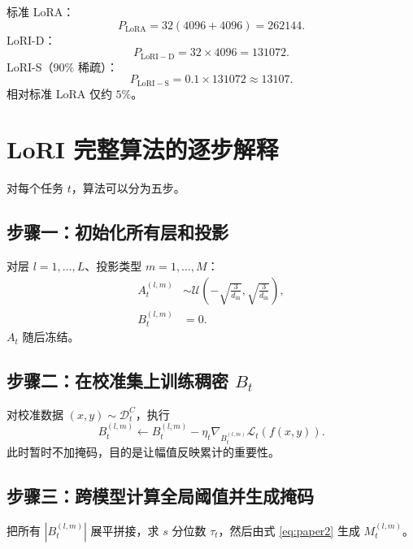 \documentclass[UTF8,12pt,a4paper,fontset=none]{ctexart}
\numberwithin{equation}{section}
\newcommand{\Loss}{\mathcal{L}}
\newcommand{\Dc}{\mathcal{D}^{C}_t}
\begin{document}
\begin{examplebox}[以 $d=4096,r=32$ 为例]
标准 LoRA：
\begin{equation*}
  P_{\mathrm{LoRA}}=32(4096+4096)=262144.
\end{equation*}
LoRI-D：
\begin{equation*}
  P_{\mathrm{LoRI-D}}=32\times4096=131072.
\end{equation*}
LoRI-S（$90\%$ 稀疏）：
\begin{equation*}
  P_{\mathrm{LoRI-S}}=0.1\times131072\approx13107.
\end{equation*}
相对标准 LoRA 仅约 $5\%$。
\end{examplebox}

\section{LoRI 完整算法的逐步解释}

对每个任务 $t$，算法可以分为五步。

\subsection{步骤一：初始化所有层和投影}

对层 $l=1,\ldots,L$、投影类型 $m=1,\ldots,M$：
\begin{align}
  A_t^{(l,m)}
  &\sim \mathcal{U}\left(
  -\sqrt{\frac{3}{d_{\mathrm{in}}}},
  \sqrt{\frac{3}{d_{\mathrm{in}}}}
  \right),\\
  B_t^{(l,m)}&=0.
\end{align}
$A_t$ 随后冻结。

\subsection{步骤二：在校准集上训练稠密 \texorpdfstring{$B_t$}{B t}}

对校准数据 $(x,y)\sim\Dc$，执行
\begin{equation}
  B_t^{(l,m)}\leftarrow B_t^{(l,m)}
  -\eta_t\nabla_{B_t^{(l,m)}}
  \Loss_t(f(x,y)).
\end{equation}
此时暂时不加掩码，目的是让幅值反映累计的重要性。

\subsection{步骤三：跨模型计算全局阈值并生成掩码}

把所有 $|B_t^{(l,m)}|$ 展平拼接，求 $s$ 分位数 $\tau_t$，然后由式 \eqref{eq:paper2} 生成 $M_t^{(l,m)}$。
\end{document}
